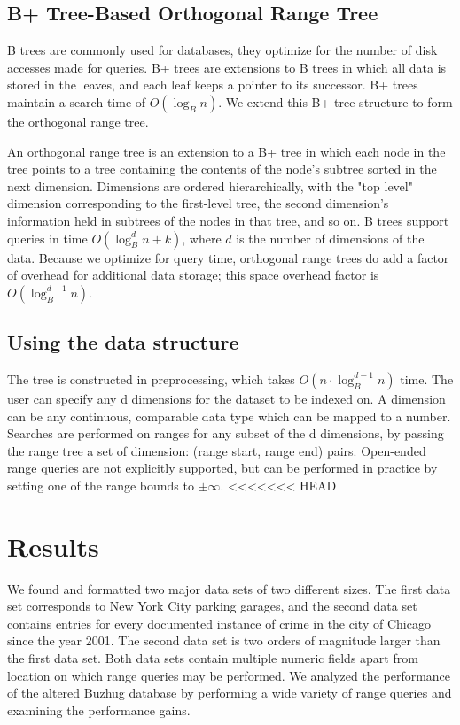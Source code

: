 \documentclass[11pt, oneside]{article}
\begin{document}
\subsection{B+ Tree-Based Orthogonal Range Tree}
B trees are commonly used for databases, they optimize for the number of disk accesses made for queries. B+ trees are extensions to B trees in which all data is stored in the leaves, and each leaf keeps a pointer to its successor. B+ trees maintain a search time of $O(\log_B n)$. We extend this B+ tree structure to form the orthogonal range tree.

An orthogonal range tree is an extension to a B+ tree in which each node in the tree points to a tree containing the contents of the node's subtree sorted in the next dimension. Dimensions are ordered hierarchically, with the "top level" dimension corresponding to the first-level tree, the second  dimension's information held in subtrees of the nodes in that tree, and so on. B trees support queries in time $O(\log_B^d n + k)$, where $d$ is the number of dimensions of the data. Because we optimize for query time, orthogonal range trees do add a factor of overhead for additional data storage; this space overhead factor is $O(\log_B^{d-1} n)$.   
	
\subsection{Using the data structure}
The tree is constructed in preprocessing, which takes $O(n \cdot \log_B^{d-1} n)$ time. The user can specify any d dimensions for the dataset to be indexed on.
A dimension can be any continuous, comparable data type which can be mapped to a number.
Searches are performed on ranges for any subset of the d dimensions, by passing the range tree a set of {dimension: (range start, range end)} pairs. Open-ended range queries are not explicitly supported, but can be performed in practice by setting one of the range bounds to $\pm\infty$.
<<<<<<< HEAD

\section{Results}

We found and formatted two major data sets of two different sizes. The first data set corresponds to New York City parking garages, and the second data set contains entries for every documented instance of crime in the city of Chicago since the year 2001. The second data set is two orders of magnitude larger than the first data set. Both data sets contain multiple numeric fields apart from location on which range queries may be performed. We analyzed the performance of the altered Buzhug database by performing a wide variety of range queries and examining the performance gains.
\end{document}
